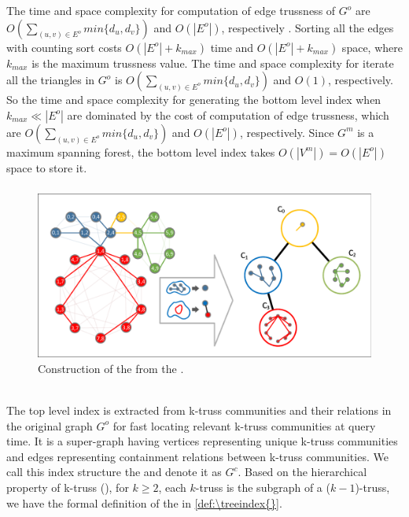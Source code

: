 The time and space complexity for computation of edge trussness of $G^o$ are $O(\sum_{(u,v) \in E^{o}}{min\{d_{u},d_{v}\}})$ and $O(|E^{o}|)$,  respectively \cite{wang2012truss}. Sorting all the edges with counting sort costs $O(|E^{o}| + k_{max})$ time and $O(|E^{o}| + k_{max})$ space, where $k_{max}$ is the maximum trussness value. The time and space complexity for iterate all the triangles in $G^o$ is $O(\sum_{(u,v) \in E^{o}}{min\{d_{u},d_{v}\}})$ and $O(1)$, respectively. So the time and space complexity for generating the bottom level index when $k_{max} \ll |E^{o}|$ are dominated by the cost of computation of edge trussness, which are $O(\sum_{(u,v) \in E^{o}} {min\{d_{u},d_{v}\}})$ and $O(|E^{o}|)$, respectively. Since $G^m$ is a maximum spanning forest, the bottom level index takes $O(|V^{m}|) = O(|E^{o}|)$ space to store it.

\subsubsection{\TreeIndex{}}
\label{top-level}

\begin{figure}[ht]
    \centering
    \includegraphics[width=0.8\linewidth, trim={0.1cm 0.1cm, 0.1cm, 0.1cm}, clip]{./figures/top_level.pdf}
    \caption{Construction of the \treeindex{} from the \inducedgraph{}.}
    \label{fig:top-level}
\end{figure}

~\\The top level index is extracted from k-truss communities and their relations in the original graph $G^o$ for fast locating relevant k-truss communities at query time. It is a super-graph having vertices representing unique k-truss communities and edges representing containment relations between k-truss communities. We call this index structure the \treeindex{} and denote it as $G^c$. Based on the hierarchical property of k-truss (\cite{cohen2008trusses}), \ie for $k \ge 2$, each $k$-truss is the subgraph of a ($k-1$)-truss, we have the formal definition of the \treeindex{} in \autoref{def:\treeindex{}}.

